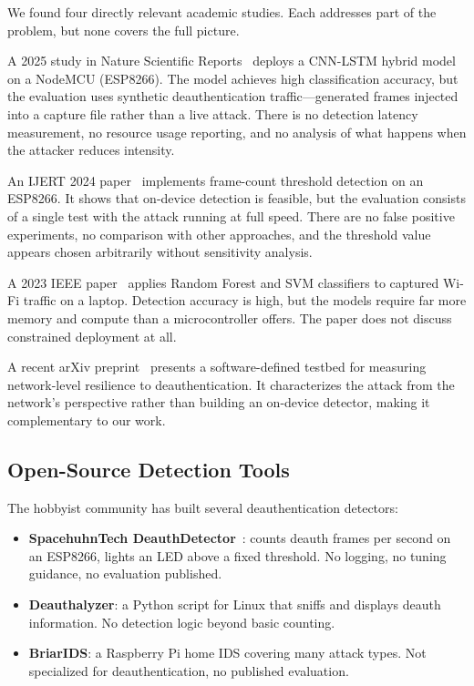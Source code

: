 \documentclass[conference]{IEEEtran}
\begin{document}
We found four directly relevant academic studies. Each addresses part of the problem, but none covers the full picture.

A 2025 study in Nature Scientific Reports~\cite{nature2025_deauth} deploys a CNN-LSTM hybrid model on a NodeMCU (ESP8266). The model achieves high classification accuracy, but the evaluation uses synthetic deauthentication traffic---generated frames injected into a capture file rather than a live attack. There is no detection latency measurement, no resource usage reporting, and no analysis of what happens when the attacker reduces intensity.

An IJERT 2024 paper~\cite{ijert2024_deauth} implements frame-count threshold detection on an ESP8266. It shows that on-device detection is feasible, but the evaluation consists of a single test with the attack running at full speed. There are no false positive experiments, no comparison with other approaches, and the threshold value appears chosen arbitrarily without sensitivity analysis.

A 2023 IEEE paper~\cite{ieee2023_deauth_ml} applies Random Forest and SVM classifiers to captured Wi-Fi traffic on a laptop. Detection accuracy is high, but the models require far more memory and compute than a microcontroller offers. The paper does not discuss constrained deployment at all.

A recent arXiv preprint~\cite{arxiv2025_deauth_testbed} presents a software-defined testbed for measuring network-level resilience to deauthentication. It characterizes the attack from the network's perspective rather than building an on-device detector, making it complementary to our work.

\subsection{Open-Source Detection Tools}

The hobbyist community has built several deauthentication detectors:

\begin{itemize}
    \item \textbf{SpacehuhnTech DeauthDetector}~\cite{spacehuhn_detector}: counts deauth frames per second on an ESP8266, lights an LED above a fixed threshold. No logging, no tuning guidance, no evaluation published.
    \item \textbf{Deauthalyzer}: a Python script for Linux that sniffs and displays deauth information. No detection logic beyond basic counting.
    \item \textbf{BriarIDS}: a Raspberry Pi home IDS covering many attack types. Not specialized for deauthentication, no published evaluation.
\end{itemize}
\end{document}
